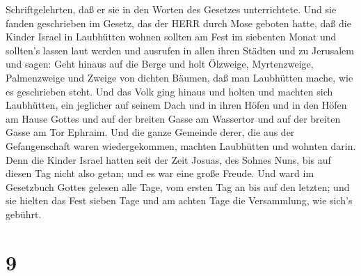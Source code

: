 Schriftgelehrten, daß er sie in den Worten des Gesetzes unterrichtete.
 Und sie fanden geschrieben im Gesetz, das der HERR durch
Mose geboten hatte, daß die Kinder Israel in Laubhütten wohnen sollten
am Fest im siebenten Monat  und sollten's lassen laut
werden und ausrufen in allen ihren Städten und zu Jerusalem und sagen:
Geht hinaus auf die Berge und holt Ölzweige, Myrtenzweige, Palmenzweige
und Zweige von dichten Bäumen, daß man Laubhütten mache, wie es
geschrieben steht.  Und das Volk ging hinaus und holten und
machten sich Laubhütten, ein jeglicher auf seinem Dach und in ihren
Höfen und in den Höfen am Hause Gottes und auf der breiten Gasse am
Wassertor und auf der breiten Gasse am Tor Ephraim.  Und
die ganze Gemeinde derer, die aus der Gefangenschaft waren
wiedergekommen, machten Laubhütten und wohnten darin. Denn die Kinder
Israel hatten seit der Zeit Josuas, des Sohnes Nuns, bis auf diesen Tag
nicht also getan; und es war eine große Freude.  Und ward
im Gesetzbuch Gottes gelesen alle Tage, vom ersten Tag an bis auf den
letzten; und sie hielten das Fest sieben Tage und am achten Tage die
Versammlung, wie sich's gebührt.

\hypertarget{section-8}{%
\section{9}\label{section-8}}

